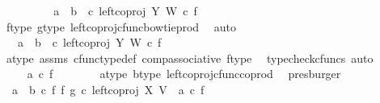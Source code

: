 \begin{isabellebody}
\ \ \ \ \isamarkupfalse%
\ \isamarkupfalse%
\ {\isachardoublequoteopen}{\isachardot}{\kern0pt}{\isachardot}{\kern0pt}{\isachardot}{\kern0pt}\ {\isacharequal}{\kern0pt}\ {\isacharparenleft}{\kern0pt}a\ {\isasymamalg}\ b{\isacharparenright}{\kern0pt}\ \ {\isasymcirc}\isactrlsub c\ left{\isacharunderscore}{\kern0pt}coproj\ Y\ W\ {\isasymcirc}\isactrlsub c\ f{\isachardoublequoteclose}\isanewline
\ \ \ \ \ \ \isamarkupfalse%
\ f{\isacharunderscore}{\kern0pt}type\ g{\isacharunderscore}{\kern0pt}type\ left{\isacharunderscore}{\kern0pt}coproj{\isacharunderscore}{\kern0pt}cfunc{\isacharunderscore}{\kern0pt}bowtie{\isacharunderscore}{\kern0pt}prod\ \isamarkupfalse%
\ auto\isanewline
\ \ \ \ \isamarkupfalse%
\ \isamarkupfalse%
\ {\isachardoublequoteopen}{\isachardot}{\kern0pt}{\isachardot}{\kern0pt}{\isachardot}{\kern0pt}\ {\isacharequal}{\kern0pt}\ {\isacharparenleft}{\kern0pt}{\isacharparenleft}{\kern0pt}a\ {\isasymamalg}\ b{\isacharparenright}{\kern0pt}\ \ {\isasymcirc}\isactrlsub c\ left{\isacharunderscore}{\kern0pt}coproj\ Y\ W{\isacharparenright}{\kern0pt}\ {\isasymcirc}\isactrlsub c\ f{\isachardoublequoteclose}\isanewline
\ \ \ \ \ \ \isamarkupfalse%
\ a{\isacharunderscore}{\kern0pt}type\ assms{\isacharparenleft}{\kern0pt}{}{\isacharparenright}{\kern0pt}\ cfunc{\isacharunderscore}{\kern0pt}type{\isacharunderscore}{\kern0pt}def\ comp{\isacharunderscore}{\kern0pt}associative\ f{\isacharunderscore}{\kern0pt}type\ \isamarkupfalse%
\ {\isacharparenleft}{\kern0pt}typecheck{\isacharunderscore}{\kern0pt}cfuncs{\isacharcomma}{\kern0pt}\ auto{\isacharparenright}{\kern0pt}\isanewline
\ \ \ \ \isamarkupfalse%
\ \isamarkupfalse%
\ {\isachardoublequoteopen}{\isachardot}{\kern0pt}{\isachardot}{\kern0pt}{\isachardot}{\kern0pt}\ {\isacharequal}{\kern0pt}\ {\isacharparenleft}{\kern0pt}a\ {\isasymcirc}\isactrlsub c\ f{\isacharparenright}{\kern0pt}{\isachardoublequoteclose}\isanewline
\ \ \ \ \ \ \isamarkupfalse%
\ a{\isacharunderscore}{\kern0pt}type\ b{\isacharunderscore}{\kern0pt}type\ left{\isacharunderscore}{\kern0pt}coproj{\isacharunderscore}{\kern0pt}cfunc{\isacharunderscore}{\kern0pt}coprod\ \isamarkupfalse%
\ presburger\isanewline
\ \ \ \ \isamarkupfalse%
\ \isamarkupfalse%
\ \ {\isachardoublequoteopen}{\isacharparenleft}{\kern0pt}a\ {\isasymamalg}\ b\ {\isasymcirc}\isactrlsub c\ f\ {\isasymbowtie}\isactrlsub f\ g{\isacharparenright}{\kern0pt}\ {\isasymcirc}\isactrlsub c\ left{\isacharunderscore}{\kern0pt}coproj\ X\ V\ {\isacharequal}{\kern0pt}\ {\isacharparenleft}{\kern0pt}a\ {\isasymcirc}\isactrlsub c\ f{\isacharparenright}{\kern0pt}{\isachardoublequoteclose}\isanewline

\end{isabellebody}
